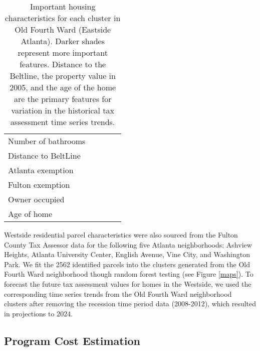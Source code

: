\documentclass{acm_proc_article-sp}
\begin{document}
\begin{table}[h!]
\begin{tabular}{l p{0.8cm}p{0.8cm}p{0.8cm}p{0.8cm}}
Number of bathrooms    & \cellcolor{gray}      & \cellcolor{lightgray} & \cellcolor{lightgray} & \cellcolor{lightgray} \\
Distance to BeltLine   & \cellcolor{black}     & \cellcolor{black}     & \cellcolor{darkgray}  & \cellcolor{black}     \\
Atlanta exemption      & \cellcolor{lightgray} & \cellcolor{gray}      &                         &                         \\
Fulton exemption       & \cellcolor{lightgray} & \cellcolor{gray}      &                         &                         \\
Owner occupied         & \cellcolor{lightgray} & \cellcolor{gray}      &                         &                         \\
Age of home            & \cellcolor{darkgray}  & \cellcolor{black}     & \cellcolor{gray}      & \cellcolor{gray}      \\ \bottomrule
\end{tabular}
\caption{Important housing characteristics for each cluster in Old Fourth Ward (Eastside Atlanta). Darker shades represent more important features. Distance to the Beltline, the property value in 2005, and the age of the home are the primary features for variation in the historical tax assessment time series trends.}
\label{features}
\end{table}

Westside residential parcel characteristics were also sourced from the Fulton County Tax Assessor data for the following five Atlanta neighborhoods: Ashview Heights, Atlanta University Center, English Avenue, Vine City, and Washington Park. We fit the 2562 identified parcels into the clusters generated from the Old Fourth Ward neighborhood though random forest testing (see Figure \ref{maps}). To forecast the future tax assessment values for homes in the Westside, we used the corresponding time series trends from the Old Fourth Ward neighborhood clusters after removing the recession time period data (2008-2012), which resulted in projections to 2024.

\subsection{Program Cost Estimation}
\end{document}
